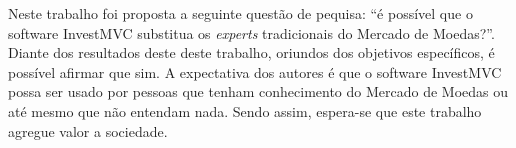 Neste trabalho foi proposta a seguinte questão de pequisa: “é possível que o software InvestMVC substitua os \textit{experts} tradicionais do Mercado de Moedas?”. Diante dos resultados deste deste trabalho, oriundos dos objetivos específicos, é possível afirmar que sim.
A expectativa dos autores é que o software InvestMVC possa ser usado por pessoas que tenham conhecimento do Mercado de Moedas ou até mesmo que não entendam nada. Sendo assim, espera-se que este trabalho agregue valor a sociedade.
